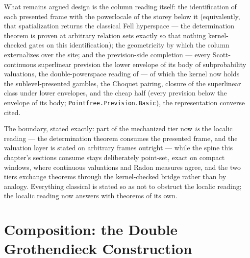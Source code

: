 \begin{remark}
What remains argued design is the column reading itself: the
identification of each presented frame with the powerlocale of the
storey below it (equivalently, that spatialization returns the
classical Fell hyperspace --- the determination theorem is proven at
arbitrary relation sets exactly so that nothing kernel-checked gates
on this identification); the geometricity by which the column
externalizes over the site; and the prevision-side completion ---
every Scott-continuous superlinear prevision the lower envelope of
its body of subprobability valuations, the double-powerspace reading
of \cite{goubaultlarrecq26} --- of which the kernel now holds the
sublevel-presented gambles, the Choquet pairing, closure of the
superlinear class under lower envelopes, and the cheap half (every
prevision below the envelope of its body;
\texttt{Pointfree.Prevision.Basic}), the representation converse
cited.

The boundary, stated exactly: part of the mechanized tier now
\emph{is} the localic reading --- the determination theorem consumes
the presented frame, and the valuation layer is stated on arbitrary
frames outright --- while the spine this chapter's sections consume
stays deliberately point-set, exact on compact windows, where
continuous valuations and Radon measures agree, and the two tiers
exchange theorems through the kernel-checked bridge rather than by
analogy. Everything classical is stated so as not to obstruct the
localic reading; the localic reading now answers with theorems of
its own.
\end{remark}

\section{Composition: the Double Grothendieck Construction}
\label{sec:su-composition}

